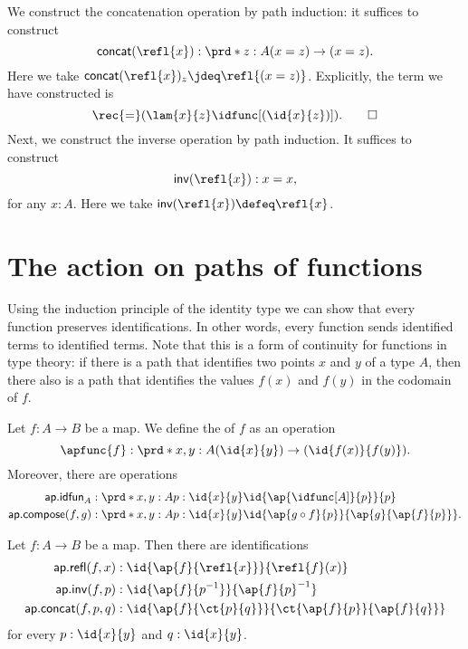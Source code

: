 \begin{constr}
We construct the concatenation operation by path induction: it suffices to construct
\begin{equation*}
\mathsf{concat}(\refl{x}):\prd*{z:A} (x=z)\to(x=z).
\end{equation*}
Here we take $\mathsf{concat}(\refl{x})_z \jdeq \refl{(x=z)}$. 
Explicitly, the term we have constructed is
\begin{equation*}
\rec{=}(\lam{x}{z}\idfunc[(\id{x}{z})]).\qedhere
\end{equation*}
Next, we construct the inverse operation by path induction. It suffices to construct
\begin{equation*}
\mathsf{inv}(\refl{x}): x=x,
\end{equation*}
for any $x:A$. Here we take $\mathsf{inv}(\refl{x})\defeq \refl{x}$.
\end{constr}

\section{The action on paths of functions}

Using the induction principle of the identity type we can show that every function preserves identifications.
In other words, every function sends identified terms to identified terms.
Note that this is a form of continuity for functions in type theory: if there is a path that identifies two points $x$ and $y$ of a type $A$, then there also is a path that identifies the values $f(x)$ and $f(y)$ in the codomain of $f$. 

\begin{defn}\label{defn:ap}
Let $f:A\to B$ be a map. We define the  of $f$ as an operation
\begin{equation*}
\apfunc{f} : \prd*{x,y:A} (\id{x}{y})\to(\id{f(x)}{f(y)}).
\end{equation*}
Moreover, there are operations
\begin{align*}
\mathsf{ap.idfun}_A & : \prd*{x,y:A}{p:\id{x}{y}} \id{\ap{\idfunc[A]}{p}}{p} \\
\mathsf{ap.compose}(f,g) & : \prd*{x,y:A}{p:\id{x}{y}} \id{\ap{g\circ f}{p}}{\ap{g}{\ap{f}{p}}}.
\end{align*}
\end{defn}

\begin{defn}
Let $f:A\to B$ be a map. Then there are identifications
\begin{align*}
\mathsf{ap.refl}(f,x) & : \id{\ap{f}{\refl{x}}}{\refl{f}(x)} \\
\mathsf{ap.inv}(f,p) & : \id{\ap{f}{p^{-1}}}{\ap{f}{p}^{-1}} \\
\mathsf{ap.concat}(f,p,q) & : \id{\ap{f}{\ct{p}{q}}}{\ct{\ap{f}{p}}{\ap{f}{q}}}
\end{align*}
for every $p:\id{x}{y}$ and $q:\id{x}{y}$.
\end{defn}


